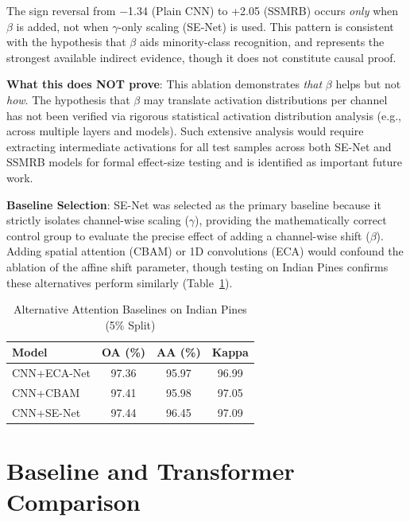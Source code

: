 \documentclass[pdflatex,sn-mathphys-num]{sn-jnl}
\theoremstyle{thmstyleone}
\theoremstyle{thmstyletwo}
\theoremstyle{thmstylethree}
\begin{document}
The sign reversal from $-$1.34 (Plain CNN) to +2.05 (SSMRB) occurs \textit{only} when $\beta$ is added, not when $\gamma$-only scaling (SE-Net) is used. This pattern is consistent with the hypothesis that $\beta$ aids minority-class recognition, and represents the strongest available indirect evidence, though it does not constitute causal proof.

\textbf{What this does NOT prove}: This ablation demonstrates \textit{that} $\beta$ helps but not \textit{how}. The hypothesis that $\beta$ may translate activation distributions per channel has not been verified via rigorous statistical activation distribution analysis (e.g., across multiple layers and models). Such extensive analysis would require extracting intermediate activations for all test samples across both SE-Net and SSMRB models for formal effect-size testing and is identified as important future work.

\textbf{Baseline Selection}: SE-Net was selected as the primary baseline because it strictly isolates channel-wise scaling ($\gamma$), providing the mathematically correct control group to evaluate the precise effect of adding a channel-wise shift ($\beta$). Adding spatial attention (CBAM) or 1D convolutions (ECA) would confound the ablation of the affine shift parameter, though testing on Indian Pines confirms these alternatives perform similarly (Table~\ref{tab:attention_baselines}).

\begin{table}[!h]
\caption{Alternative Attention Baselines on Indian Pines (5\% Split)}
\label{tab:attention_baselines}
\centering
\begin{tabular}{lccc}
\toprule
\textbf{Model} & \textbf{OA (\%)} & \textbf{AA (\%)} & \textbf{Kappa} \\
\midrule
CNN+ECA-Net & 97.36 & 95.97 & 96.99 \\
CNN+CBAM & 97.41 & 95.98 & 97.05 \\
CNN+SE-Net & 97.44 & 96.45 & 97.09 \\
\bottomrule
\end{tabular}
\end{table}

\section{Baseline and Transformer Comparison}
\end{document}
